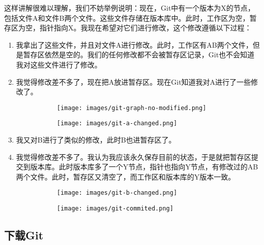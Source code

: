 \documentclass[../main.tex]{subfiles}
\begin{document}
这样讲解很难以理解，我们不妨举例说明：现在，Git中有一个版本为X的节点，包括文件A和文件B两个文件。这些文件存储在版本库中。此时，工作区为空，暂存区为空，指针指向X。我现在希望对它们进行修改，这个修改遵循以下过程：

\begin{enumerate}
  \item 我拿出了这些文件，并且对文件A进行修改。此时，工作区有AB两个文件，但是暂存区依然是空的。我们的任何修改都不会被暂存区记录，Git也不会知道我对这些文件进行了修改。

  \item 我觉得修改差不多了，现在把A放进暂存区。现在Git知道我对A进行了一些修改了。
    \begin{figure}[ht]
      \begin{subfigure}[t]{0.45\linewidth}
        \centering
        \texttt{[image: images/git-graph-no-modified.png]}
      \end{subfigure}
      \hfill               %
      \begin{subfigure}[t]{0.45\linewidth}
        \centering
        \texttt{[image: images/git-a-changed.png]}
      \end{subfigure}
    \end{figure}
  \item 我又对B进行了类似的修改，此时B也进暂存区了。
  \item 我觉得修改差不多了。我认为我应该永久保存目前的状态，于是就把暂存区提交到版本库。此时版本库多了一个Y节点，指针也指向Y节点，有修改过的AB两个文件。此时，暂存区又清空了，而工作区和版本库的Y版本一致。
    \begin{figure}[ht]
      \begin{subfigure}[t]{0.45\linewidth}
        \centering
        \texttt{[image: images/git-b-changed.png]}
      \end{subfigure}
      \hfill               %
      \begin{subfigure}[t]{0.45\linewidth}
        \centering
        \texttt{[image: images/git-commited.png]}
      \end{subfigure}
    \end{figure}
\end{enumerate}

\subsection{下载Git}
\end{document}
